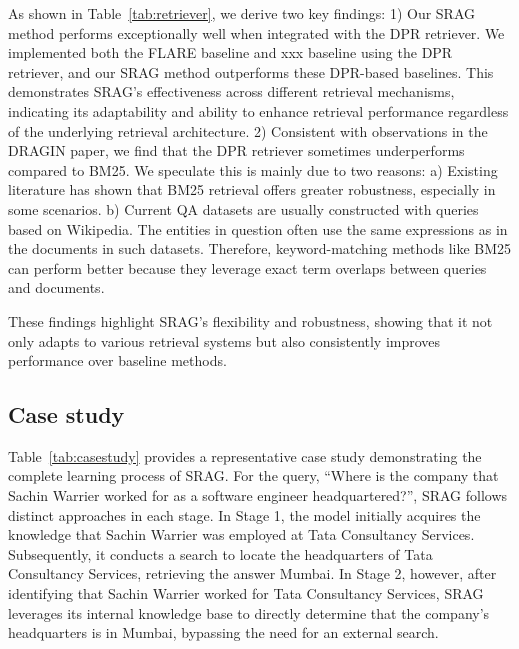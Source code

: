 As shown in Table~\ref{tab:retriever}, we derive two key findings:
1) Our SRAG method performs exceptionally well when integrated with the DPR retriever. We implemented both the FLARE baseline and xxx baseline using the DPR retriever, and our SRAG method outperforms these DPR-based baselines. This demonstrates SRAG's effectiveness across different retrieval mechanisms, indicating its adaptability and ability to enhance retrieval performance regardless of the underlying retrieval architecture.
2) Consistent with observations in the DRAGIN paper, we find that the DPR retriever sometimes underperforms compared to BM25. We speculate this is mainly due to two reasons: a)  Existing literature has shown that BM25 retrieval offers greater robustness, especially in some scenarios. b) Current QA datasets are usually constructed with queries based on Wikipedia. The entities in question often use the same expressions as in the documents in such datasets. Therefore, keyword-matching methods like BM25 can perform better because they leverage exact term overlaps between queries and documents.


These findings highlight SRAG's flexibility and robustness, showing that it not only adapts to various retrieval systems but also consistently improves performance over baseline methods.

\subsection{Case study}

Table~\ref{tab:casestudy} provides a representative case study demonstrating the complete learning process of SRAG. For the query, ``Where is the company that Sachin Warrier worked for as a software engineer headquartered?'', SRAG follows distinct approaches in each stage. In Stage 1, the model initially acquires the knowledge that Sachin Warrier was employed at Tata Consultancy Services. Subsequently, it conducts a search to locate the headquarters of Tata Consultancy Services, retrieving the answer Mumbai. In Stage 2, however, after identifying that Sachin Warrier worked for Tata Consultancy Services, SRAG leverages its internal knowledge base to directly determine that the company's headquarters is in Mumbai, bypassing the need for an external search.